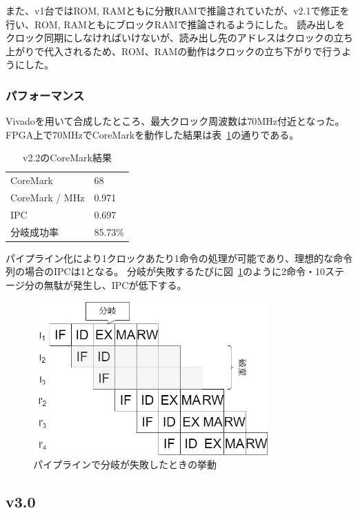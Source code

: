\documentclass[dvipdfmx,10pt,a4paper,titlepage]{jsarticle}
\begin{document}
    また、v1台ではROM, RAMともに分散RAMで推論されていたが、v2.1で修正を行い、ROM, RAMともにブロックRAMで推論されるようにした。
    読み出しをクロック同期にしなければいけないが、読み出し先のアドレスはクロックの立ち上がりで代入されるため、ROM、RAMの動作はクロックの立ち下がりで行うようにした。

    \subsubsection{パフォーマンス}
    Vivadoを用いて合成したところ、最大クロック周波数は$70\mathrm{MHz}$付近となった。
    FPGA上で$70\mathrm{MHz}$でCoreMarkを動作した結果は表~\ref{tab:v2.2}の通りである。
    \begin{table}[h]
        \begin{center}
            \caption{v2.2のCoreMark結果}\label{tab:v2.2}
            \begin{tabular}{ll}
                CoreMark & 68 \\
                CoreMark / MHz & 0.971 \\
                IPC & 0.697 \\
                分岐成功率 & 85.73\% \\
            \end{tabular}
        \end{center}
    \end{table}
    パイプライン化により1クロックあたり1命令の処理が可能であり、理想的な命令列の場合のIPCは1となる。
    分岐が失敗するたびに図~\ref{fig:predictfail}のように2命令・10ステージ分の無駄が発生し、IPCが低下する。
    \begin{figure}[h]
        \centering
        \includegraphics[width=9cm]{figure/predict_fail.png}
        \caption{パイプラインで分岐が失敗したときの挙動}\label{fig:predictfail}
    \end{figure}
    \subsection{v3.0}
\end{document}
